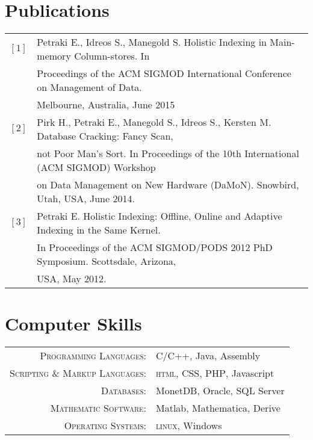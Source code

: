 \documentclass[a4paper,10pt]{article}
\begin{document}
\section{Publications}
\begin{tabular}{rl}
$[1]$ &Petraki E., Idreos S., Manegold S. Holistic Indexing in Main-memory Column-stores. In \\ &Proceedings of the ACM SIGMOD International Conference on Management of Data. \\
&Melbourne, Australia, June 2015\\
$[2]$ &Pirk H., Petraki E., Manegold S., Idreos S., Kersten M. Database Cracking: Fancy Scan,\\
 &not Poor Man's Sort.  In Proceedings of the 10th International (ACM SIGMOD) Workshop\\
 &on Data Management on New Hardware (DaMoN). Snowbird, Utah, USA, June 2014.\\
 $[3]$ &Petraki E. Holistic Indexing: Offline, Online and Adaptive Indexing in the Same Kernel.\\
 &In Proceedings of the ACM SIGMOD/PODS 2012 PhD Symposium. Scottsdale, Arizona, \\
 &USA, May 2012.
\end{tabular}




\section{Computer Skills}
\begin{tabular}{rl}
 \textsc{Programming Languages}:& C/C++, Java, Assembly\\
 \textsc{Scripting $\&$ Markup Languages}:& \textsc{html}, \textsc{CSS}, \textsc{PHP}, Javascript\\
\textsc{Databases}:& MonetDB, Oracle, \textsc{SQL} Server\\
 \textsc{Mathematic Software}:& Matlab, Mathematica, Derive\\
\textsc{Operating Systems}:& \textsc{linux}, Windows\\
\end{tabular}
\end{document}

